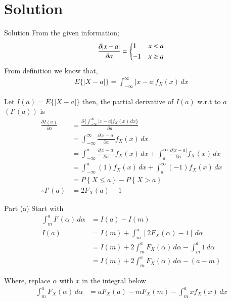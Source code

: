 \documentclass{beamer}
\providecommand{\cbrak}[1]{\ensuremath{\left\{#1\right\}}}
\begin{document}
\section{Solution}
\begin{frame}{Solution}
  From the given information;
       \begin{align}
         \frac{\partial |x-a|}{\partial a}=
            \begin{dcases}
                 1 & x < a \\
                -1 & x \geq a \\
            \end{dcases}
       \end{align} 
  From definition we know that,
      \begin{align}
         E\{|X-a|\} = \int_{-\infty}^{\infty} |x-a|f_X(x) \, dx
      \end{align}
\end{frame}


\begin{frame}
  Let $I(a) = E\{|X-a|\}$ then, the partial derivative of $I(a)$ w.r.t to $a$  $(I'(a))$ is
   \begin{align}
      \frac{\partial I(a)}{\partial a} &= \frac{\partial \{\int_{-\infty}^{\infty} |x-a|f_X(x) \, dx\}}{\partial a} \\
                                       &= \int_{-\infty}^{\infty} \frac{\partial |x-a|}{\partial a}f_X(x) \, dx \\
                                       &= \int_{-\infty}^{a} \frac{\partial |x-a|}{\partial a}f_X(x) \, dx + \int_{a}^{\infty} \frac{\partial |x-a|}{\partial a}f_X(x) \, dx \\
                                       &= \int_{-\infty}^{a} (1)f_X(x) \, dx + \int_{a}^{\infty} (-1)f_X(x) \, dx \\
                                       &=  P\cbrak{X \le a} - P\cbrak{X > a} \\
                     \therefore I'(a)  &= 2 F_X(a) - 1 
   \end{align}    
\end{frame}
 

\begin{frame}{Part (a)}
   Start with
   \begin{align}
      \int_{m}^{a} I'(\alpha) \, d\alpha &= I(a) - I(m) \\
      							   I(a) &= I(m) + \int_{m}^{a} [2 F_X(\alpha) - 1]  \, d\alpha \\
      							        &= I(m) + 2\int_{m}^{a}  F_X(\alpha)   \, d\alpha - \int_{m}^{a} 1  \, d\alpha \\
      							        &= I(m) + 2\int_{m}^{a}  F_X(\alpha)   \, d\alpha - (a - m) \label{eq15}
   \end{align}    
    
    Where, replace $\alpha$ with $x$ in the integral below
    \begin{align}
       \int_{m}^{a} F_X(\alpha)  \, d\alpha &= a F_X(a) - m F_X(m) - \int_{m}^{a} x f_X(x)   \, dx  \label{eq16}
    \end{align}
\end{frame}
\end{document}
